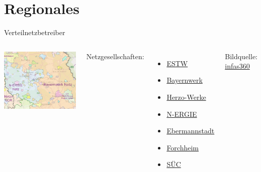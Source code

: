\section{Regionales}

\begin{frame}{Verteilnetzbetreiber}
   \begin{columns}
      \centering
      \includegraphics[width=\linewidth]{images/Verteilnetzbetreiber_Umland_ERH.png}

      Netzgesellschaften:
      \begin{itemize}
         \item \href{https://netze.estw.de/}{ESTW}
         \item \href{https://www.bayernwerk-netz.de/de.html}{Bayernwerk}
         \item \href{https://www.herzowerke.de/de/netz/stromnetz/}{Herzo-Werke}
         \item \href{https://www.n-ergie-netz.de/}{N-ERGIE}
         \item \href{https://www.stadtwerke-ebermannstadt.de/de/Kopfnavigation/Netze1/Stromnetz/}{Ebermannstadt}
         \item \href{https://www.stadtwerke-forchheim.de/}{Forchheim}
         \item \href{https://www.suec-netze.de/}{SÜC}
      \end{itemize}
      Bildquelle: \href{https://www.netze-und-versorger.de/}{infas360}
   \end{columns}
\end{frame}


